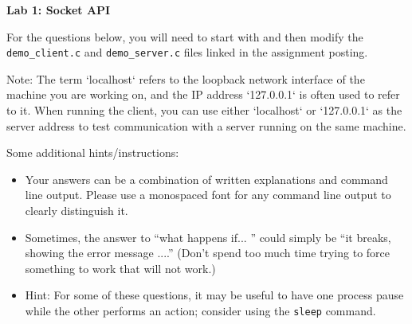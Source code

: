 \documentclass[12pt]{article}
\author{Isaac Boaz}
\begin{document}
\maketitle

\begin{center}
    \Large \textbf{Lab 1: Socket API}
\end{center}

\vspace{1cm}

For the questions below, you will need to start with and then modify the \texttt{demo\_client.c} and \texttt{demo\_server.c} files linked in the assignment posting.

Note: The term `localhost` refers to the loopback network interface of the machine you are working on, and the IP address `127.0.0.1` is often used to refer to it. When running the client, you can use either `localhost` or `127.0.0.1` as the server address to test communication with a server running on the same machine.

Some additional hints/instructions:
\begin{itemize}
    \item Your answers can be a combination of written explanations and command line output. Please use a monospaced font for any command line output to clearly distinguish it.
    \item Sometimes, the answer to “what happens if... ” could simply be “it breaks, showing the error message ....” (Don't spend too much time trying to force something to work that will not work.)
    \item Hint: For some of these questions, it may be useful to have one process pause while the other performs an action; consider using the \texttt{sleep} command.
\end{itemize}

\vspace{1cm}
\end{document}
